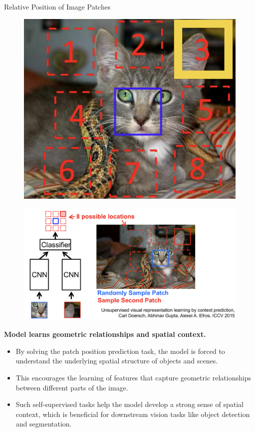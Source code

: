 \begin{frame}[allowframebreaks]{Relative Position of Image Patches}
    \begin{figure}
        \centering
        \includegraphics[width=\linewidth,height=0.9\textheight,keepaspectratio]{images/ssl/slide_30_1_img.png}
    \end{figure}

    \framebreak

    \begin{figure}
        \centering
        \includegraphics[width=\linewidth,height=0.9\textheight,keepaspectratio]{images/ssl/slide_31_1_img.png}
    \end{figure}

    \framebreak

    \textbf{Model learns geometric relationships and spatial context.}
    \begin{itemize}
        \item By solving the patch position prediction task, the model is forced to understand the underlying spatial structure of objects and scenes.
        \item This encourages the learning of features that capture geometric relationships between different parts of the image.
        \item Such self-supervised tasks help the model develop a strong sense of spatial context, which is beneficial for downstream vision tasks like object detection and segmentation.
    \end{itemize}


\end{frame}
